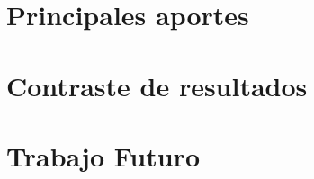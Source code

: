 \documentclass[12pt]{report}
\begin{document}
\section{Principales aportes}
\lipsum[1]%

\section{Contraste de resultados}
\lipsum[1]%

\section{Trabajo Futuro}
\lipsum[1]%









\end{document}
